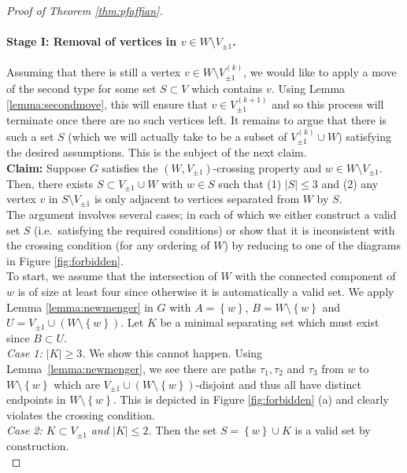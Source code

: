 \documentclass{article}
\numberwithin{equation}{section}
\theoremstyle{definition}
\theoremstyle{definition}
\theoremstyle{remark}
\newcommand{\Vis}{V_{\mathrm{Ising}}}
\renewcommand{\Vis}{V_{\pm 1}}
\begin{document}
\begin{proof}[Proof of Theorem \ref{thm:pfaffian}]
	\paragraph{Stage I: Removal of vertices in $v \in W \setminus \Vis$.}
	Assuming that there is still a vertex $v \in W \setminus \Vis^{(k)}$, we would like to apply a move of the second type for some set $S \subset V$ which contains $v$. Using Lemma \ref{lemma:secondmove}, this will ensure that $v \in \Vis^{(k+1)}$ and so this process will terminate once there are no such vertices left. 
	It remains to argue that there is such a set $S$ (which we will actually take to be a subset of $\Vis^{(k)} \cup W$) satisfying the desired assumptions. This is the subject of the next claim.
	\\[1em]
	\noindent\textbf{Claim: }Suppose $G$ satisfies the $(W,\Vis)$-crossing property and $w \in W \setminus \Vis$. Then, there exists $S \subset \Vis \cup W$ with $w \in S$ such that (1) $|S| \leq 3$ and (2) any vertex $v$ in $S \setminus \Vis$ is only adjacent to vertices separated from $W$ by $S$.
	\\[1em]
	The argument involves several cases; in each of which we either construct a valid set $S$ 
	(i.e.~satisfying the required conditions) 
	or show that it is inconsistent with the crossing condition (for any ordering of $W$) by reducing to one of the diagrams in Figure \ref{fig:forbidden}.
	\\[1em]
	\noindent To start, we assume that the intersection of $W$ with the connected component of $w$ is of size at least four since otherwise it is automatically a valid set.
	We apply Lemma \ref{lemma:newmenger} in $G$ with $A = \left\{ w \right\}$, $B = W \setminus \left\{ w \right\}$ and $U = \Vis \cup \left( W \setminus \left\{ w \right\}  \right)$. 
	Let $K$ be a minimal separating set which must exist since $B \subset U$.
	\\[1em]
	\noindent\emph{Case 1: $|K| \geq 3$.} We show this cannot happen. Using Lemma~\ref{lemma:newmenger}, we see there are paths $\tau_1,\tau_2$ and $\tau_3$ from $w$ to $W \setminus \left\{ w \right\}$ which are $\Vis \cup (W \setminus \left\{ w \right\})$-disjoint and thus all have distinct endpoints in $W \setminus \left\{ w \right\}$. This is depicted in Figure \ref{fig:forbidden} (a) and clearly violates the crossing condition.
	\\[1em]
	\noindent\emph{Case 2: $K \subset \Vis$ and $|K| \leq 2$.} Then the set $S = \left\{ w \right\} \cup K$ is a valid set by construction.
	\\[1em]

\end{proof}
\end{document}
